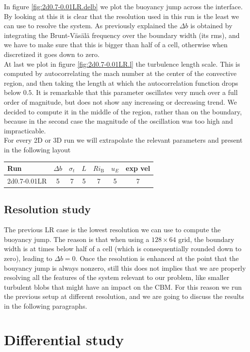  In figure \ref{fig:2d0.7-0.01LR.delb} we plot the buoyancy jump across the interface. By looking at this it is clear that the resolution used in this run is the least we can use to resolve the system. As previously explained the $\Delta b$ is obtained by integrating the Brunt-Väsälä frequency over the boundary width (its rms), and we have to make sure that this is bigger than half of a cell, otherwise when discretized it goes down to zero. \\
At last we plot in figure \ref{fig:2d0.7-0.01LR.l} the turbulence length scale. This is computed by autocorrelating the mach number at the center of the convective region, and then taking the length at which the autocorrelation function drops below $0.5$. It is remarkable that this parameter oscillates very much over a full order of magnitude, but does not show any increasing or decreasing trend. We decided to compute it in the middle of the region, rather than on the boundary, because in the second case the magnitude of the oscillation was too high and impracticable. \\
For every 2D or 3D run we will extrapolate the relevant parameters and present in the following layout
\begin{center}
 \begin{tabular}{|l|c|c|c|c|c|c|}
	  \hline
	  Run & $\Delta b$ & $\sigma_t$ & $L$ & $Ri_{\mathrm{B}}$ & $u_E$ & exp vel\\
	  	\hline
		2d0.7-0.01LR & 5 & 7& 5 & 7& 5 & 7 \\ 
	      \hline
      \end{tabular}
 \end{center}

\subsection{Resolution study}
The previous LR case is the lowest resolution we can use to compute the buoyancy jump. The reason is that when using a $128 \times 64$ grid, the boundary width is at times below half of a cell (which is consequentially rounded down to zero), leading to $\Delta b =0$. Once the resolution is enhanced at the point that the bouyancy jump is always nonzero, still this does not implies that we are properly resolving all the features of the system relevant to our problem, like smaller turbulent blobs that might have an impact on the CBM. For this reason we run the previous setup at different resolution, and we are going to discuss the results in the following paragraphs.

\section{Differential study}

